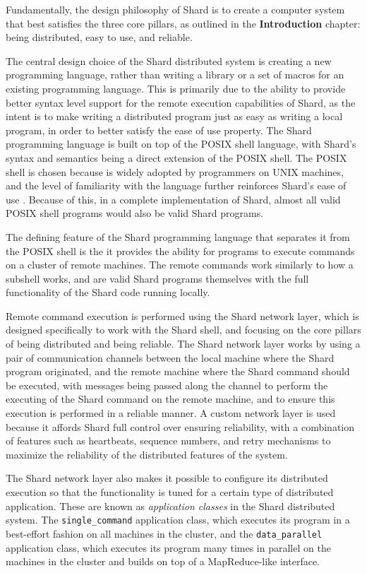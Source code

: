 \documentclass[twoside]{report}
\begin{document}
Fundamentally, the design philosophy of Shard is to create a computer system that best satisfies the three core pillars, as outlined in the \textbf{Introduction} chapter: being distributed, easy to use, and reliable.

The central design choice of the Shard distributed system is creating a new programming language, rather than writing a library or a set of macros for an existing programming language.
This is primarily due to the ability to provide better syntax level support for the remote execution capabilities of Shard, as the intent is to make writing a distributed program just as easy as writing a local program, in order to better satisfy the ease of use property.
The Shard programming language is built on top of the POSIX shell language, with Shard's syntax and semantics being a direct extension of the POSIX shell.
The POSIX shell is chosen because is widely adopted by programmers on UNIX machines, and the level of familiarity with the language further reinforces Shard's ease of use \cite{posix2017}.
Because of this, in a complete implementation of Shard, almost all valid POSIX shell programs would also be valid Shard programs.

The defining feature of the Shard programming language that separates it from the POSIX shell is the it provides the ability for programs to execute commands on a cluster of remote machines.
The remote commands work similarly to how a subshell works, and are valid Shard programs themselves with the full functionality of the Shard code running locally.

Remote command execution is performed using the Shard network layer, which is designed specifically to work with the Shard shell, and focusing on the core pillars of being distributed and being reliable.
The Shard network layer works by using a pair of communication channels between the local machine where the Shard program originated, and the remote machine where the Shard command should be executed, with messages being passed along the channel to perform the executing of the Shard command on the remote machine, and to ensure this execution is performed in a reliable manner.
A custom network layer is used because it affords Shard full control over ensuring reliability, with a combination of features such as heartbeats, sequence numbers, and retry mechanisms to maximize the reliability of the distributed features of the system.

The Shard network layer also makes it possible to configure its distributed execution so that the functionality is tuned for a certain type of distributed application.
These are known as \textit{application classes} in the Shard distributed system.
The \texttt{single\_command} application class, which executes its program in a best-effort fashion on all machines in the cluster, and the \texttt{data\_parallel} application class, which executes its program many times in parallel on the machines in the cluster and builds on top of a MapReduce-like \cite{dean2004mapreduce} interface.
\end{document}
